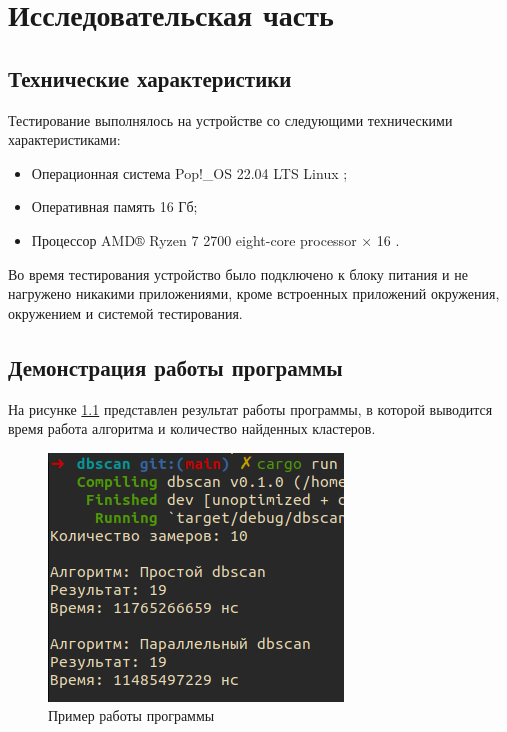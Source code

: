 \chapter{Исследовательская часть}
\section{Технические характеристики}
Тестирование выполнялось на устройстве со следующими техническими характеристиками:
\begin{itemize}
	\item Операционная система Pop!\_OS 22.04 LTS \cite{ubuntu} Linux \cite{linux};
	\item Оперативная память 16 Гб;
	\item Процессор AMD® Ryzen 7 2700 eight-core processor × 16 \cite{amd}.
\end{itemize}

Во время тестирования устройство было подключено к блоку питания и не нагружено никакими приложениями, кроме встроенных приложений окружения, окружением и системой тестирования.

\section{Демонстрация работы программы}



На рисунке \ref{demonstration} представлен результат работы программы, в которой выводится время работа алгоритма и количество найденных кластеров.

\begin{figure}[ht!]
	\begin{center}
		\captionsetup{singlelinecheck = false, justification=centerfirst}
		\includegraphics[scale=0.8]{assets/demonstration.png}
		\caption{Пример работы программы}
		\label{demonstration}
	\end{center}
	
	
\end{figure}

